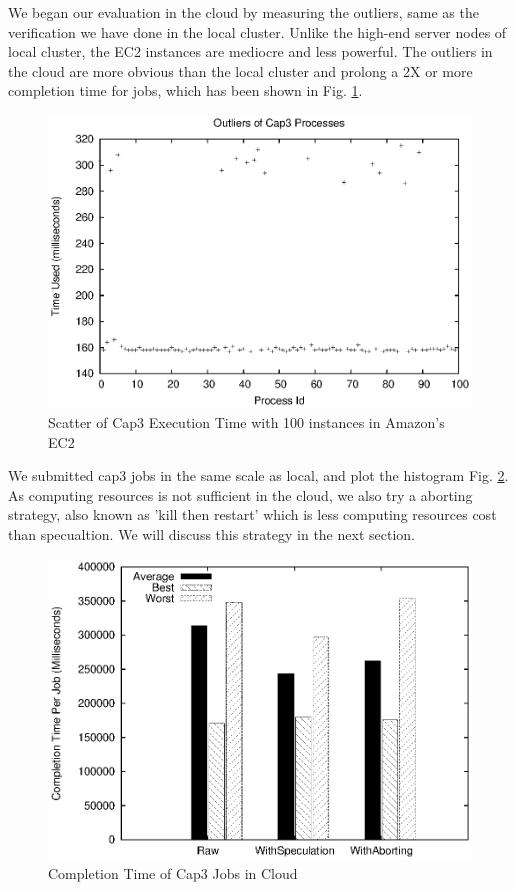 We began our evaluation in the cloud by measuring the outliers, same as the verification we have done in the local cluster. Unlike the high-end server nodes of local cluster, the EC2 instances are mediocre and less powerful. The outliers in the cloud are more obvious than the local cluster and prolong a 2X or more completion time for jobs, which has been shown in Fig. \ref{figure:outlier_cloud}.

\begin{figure}
\centering
\includegraphics[width=0.9\columnwidth]{figures/cloud_outliers.eps}
\caption{Scatter of Cap3 Execution Time with 100 instances in Amazon's EC2}
\label{figure:outlier_cloud}
\end{figure}

We submitted cap3 jobs in the same scale as local, and plot the histogram Fig. \ref{figure:completiontime_cap3_cloud}. As computing resources is not sufficient in the cloud, we also try a aborting strategy, also known as 'kill then restart' which is less computing resources cost than specualtion. We will discuss this strategy in the next section.

\begin{figure}
\centering
\includegraphics[width=0.9\columnwidth]{figures/cloud_completiontime_cap3.eps}
\caption{Completion Time of Cap3 Jobs in Cloud}
\label{figure:completiontime_cap3_cloud}
\end{figure}

